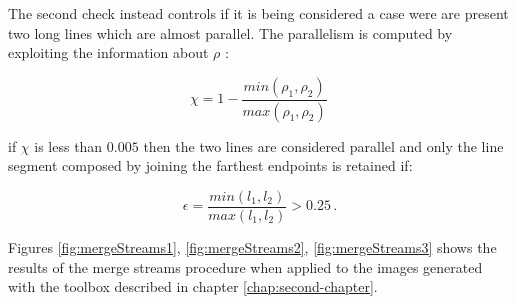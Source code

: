 The second check instead controls if it is being considered a case were are present two long lines which are almost parallel. The parallelism is computed by exploiting the information about $\rho$ :

\begin{equation}
  \chi = 1 - \frac{min(\rho_1,\rho_2)}{max(\rho_1,\rho_2)} \,
\end{equation}

if $\chi$ is less than $0.005$ then the two lines are considered parallel and only the line segment composed by joining the farthest endpoints is retained if:

\begin{equation}
  \epsilon = \frac{min(l_1,l_2)}{max(l_1,l_2)} > 0.25 \,.
\end{equation}

Figures \ref{fig:mergeStreams1}, \ref{fig:mergeStreams2}, \ref{fig:mergeStreams3} shows the results of the merge streams procedure when applied to the images generated with the toolbox described in chapter \ref{chap:second-chapter}.


